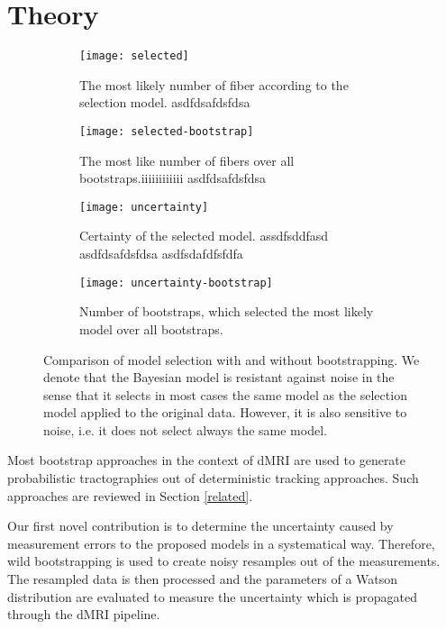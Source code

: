 \section{Theory}
\begin{figure*}[t]
	\centering
	\begin{subfigure}[b]{0.24\linewidth}
		\texttt{[image: selected]}
		\caption{The most likely number of fiber according to the
		selection model. {\color{white}asdfdsafdsfdsa}}
		\label{fig:selected-uncertainty:rank-original}
	\end{subfigure}
	\begin{subfigure}[b]{0.24\linewidth}
		\texttt{[image: selected-bootstrap]}
		\caption{The most like number of fibers over all
		bootstraps.{\color{white}iiiiiiiiiiii asdfdsafdsfdsa}}
		\label{fig:selected-uncertainty:rank}
\end{subfigure}  
	\begin{subfigure}[b]{0.24\linewidth}
		\texttt{[image: uncertainty]}
		\caption{Certainty of the selected model.
		{\color{white}assdfsddfasd asdfdsafdsfdsa asdfsdafdfsfdfa}}
		
		\label{fig:selected-uncertainty:unc-original}
	\end{subfigure}
	\begin{subfigure}[b]{0.24\linewidth}
		\texttt{[image: uncertainty-bootstrap]}
		\caption{Number of bootstraps, which selected the most likely
		model over all bootstraps.}
		\label{fig:selected-uncertainty:unc}
	\end{subfigure}
	\caption{Comparison of model selection with and without bootstrapping.
	We denote that the Bayesian model is resistant against noise in the
sense that it selects in most cases the same model as the selection model
applied to the original data. However, it is also sensitive to noise, i.e. it
does not select always the same model.}
	\label{fig:selected-uncertainty}
\end{figure*}

Most bootstrap approaches in the context of dMRI are used  to generate
probabilistic tractographies out of deterministic tracking approaches. Such
approaches are reviewed in Section \ref{related}. 

Our first novel contribution is to determine the uncertainty caused by
measurement errors to the proposed models in a systematical way. Therefore, wild bootstrapping is used to create
noisy resamples out of the measurements. The resampled data is then processed
and the parameters of a Watson distribution are evaluated to measure the
uncertainty which is propagated through the dMRI pipeline. 

